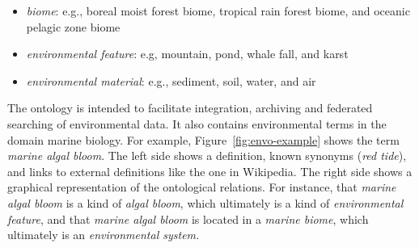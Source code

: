 \begin{itemize}
\item \emph{biome}: e.g., boreal moist forest biome, tropical rain forest biome, and oceanic pelagic zone biome 
\item \emph{environmental feature}: e.g, mountain, pond, whale fall, and karst
\item \emph{environmental material}: e.g., sediment, soil, water, and air
\end{itemize}

\noindent The ontology is intended to facilitate integration, archiving and federated searching of environmental data.
It also contains environmental terms in the domain marine biology.
For example, Figure~\ref{fig:envo-example} shows the term \emph{marine algal bloom}.
The left side shows a definition, known synonyms (\emph{red tide}), and links to external definitions like the one in Wikipedia.
The right side shows a graphical representation of the ontological relations.
For instance, that \emph{marine algal bloom} is a kind of \emph{algal bloom}, which ultimately is a kind of \emph{environmental feature}, and that  \emph{marine algal bloom} is located in a\emph{ marine biome}, which ultimately is an \emph{environmental system.}

